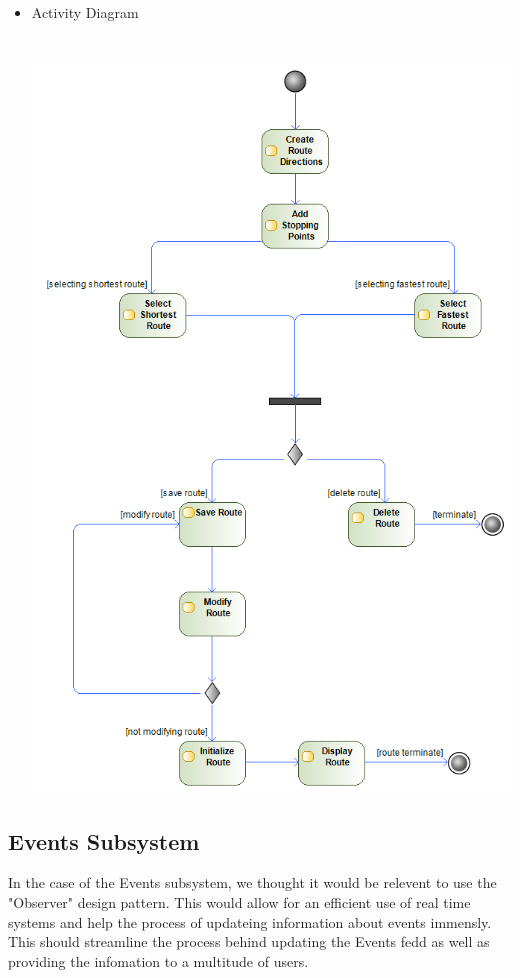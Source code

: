 \documentclass{article}
\begin{document}
\begin{itemize}
				\item Activity Diagram
 				\\
 				\\
 				\\ 			
				\includegraphics[scale=0.45]{navigationActivityDiagram.png}
				
				
			\end{itemize}

		\subsection{Events Subsystem}
				In the case of the Events subsystem, we thought it would be relevent to use the "Observer" design pattern. This would allow for an efficient use of real time systems and help the process of updateing information about events immensly. This should streamline the process behind updating the Events fedd as well as providing the infomation to a multitude of users. 
				
\end{document}
